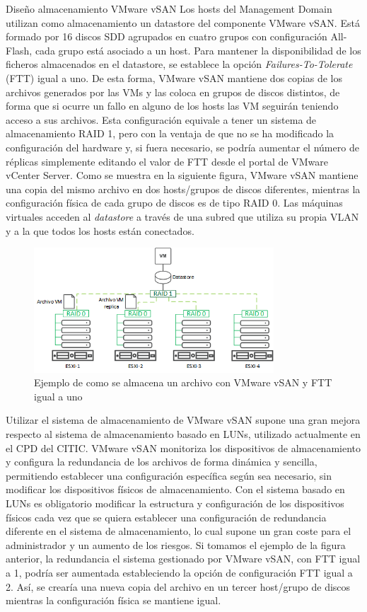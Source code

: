 \begin{subsubsection}{Diseño almacenamiento VMware vSAN}
  \label{subsubsec:diseno-vsan}
  Los hosts del Management Domain utilizan como almacenamiento un datastore del componente VMware vSAN. Está formado por 16 discos SDD agrupados en cuatro grupos con configuración All-Flash, cada grupo está asociado a un host. Para mantener la disponibilidad de los ficheros almacenados en el datastore, se establece la opción \textit{Failures-To-Tolerate} (FTT) igual a uno. De esta forma, VMware vSAN mantiene dos copias de los archivos generados por las VMs y las coloca en grupos de discos distintos, de forma que si ocurre un fallo en alguno de los hosts las VM seguirán teniendo acceso a sus archivos. Esta configuración equivale a tener un sistema de almacenamiento RAID 1, pero con la ventaja de que no se ha modificado la configuración del hardware y, si fuera necesario, se podría aumentar el número de réplicas simplemente editando el valor de FTT desde el portal de VMware vCenter Server. Como se muestra en la siguiente figura, VMware vSAN mantiene una copia del mismo archivo en dos hosts/grupos de discos diferentes, mientras la configuración física de cada grupo de discos es de tipo RAID 0. Las máquinas virtuales acceden al \textit{datastore} a través de una subred que utiliza su propia VLAN y a la que todos los hosts están conectados.
  \begin{figure}[h]
    \centering
    \includegraphics[width=0.8\textwidth]{imaxes/pruebaconcepto/vSANconfig.png}
    \caption{Ejemplo de como se almacena un archivo con VMware vSAN y FTT igual a uno}
    \label{fig:vSAN-config-FTT}
  \end{figure}
  \FloatBarrier
  Utilizar el sistema de almacenamiento de VMware vSAN supone una gran mejora respecto al sistema de almacenamiento basado en LUNs, utilizado actualmente en el CPD del CITIC. VMware vSAN monitoriza los dispositivos de almacenamiento y configura la redundancia de los archivos de forma dinámica y sencilla, permitiendo establecer una configuración específica según sea necesario, sin modificar los dispositivos físicos de almacenamiento. Con el sistema basado en LUNs es obligatorio modificar la estructura y configuración de los dispositivos físicos cada vez que se quiera establecer una configuración de redundancia diferente en el sistema de almacenamiento, lo cual supone un gran coste para el administrador y un aumento de los riesgos. Si tomamos el ejemplo de la figura anterior, la redundancia el sistema gestionado por VMware vSAN, con FTT igual a 1, podría ser aumentada estableciendo la opción de configuración FTT igual a 2. Así, se crearía una nueva copia del archivo en un tercer host/grupo de discos mientras la configuración física se mantiene igual.

\end{subsubsection}
